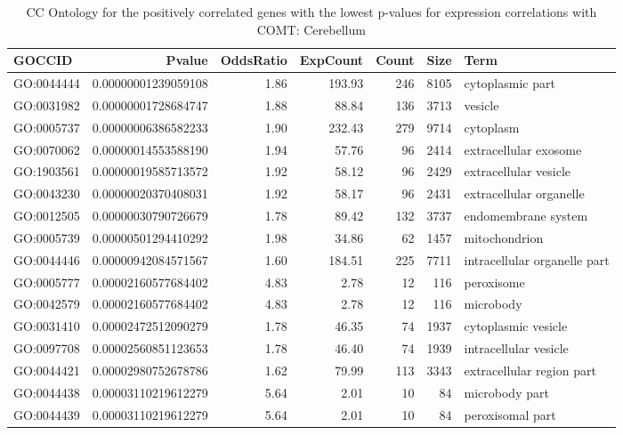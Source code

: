 \documentclass[letterpaper,12pt]{article}
\numberwithin{equation}{appendix}
\begin{document}
\noindent

\begin{landscape}

{\footnotesize {
\setlength\LTleft{-1cm}
\setlength\LTright{-1cm}
\begin{longtable}{lrrrrrl}
\caption{CC Ontology for the positively correlated genes with the lowest p-values for expression correlations with COMT: Cerebellum} \\ 
  \toprule
GOCCID & Pvalue & OddsRatio & ExpCount & Count & Size & Term \\ 
  \midrule
GO:0044444 & 0.00000001239059108 & 1.86 & 193.93 & 246 & 8105 & cytoplasmic part \\ 
  GO:0031982 & 0.00000001728684747 & 1.88 & 88.84 & 136 & 3713 & vesicle \\ 
  GO:0005737 & 0.00000006386582233 & 1.90 & 232.43 & 279 & 9714 & cytoplasm \\ 
  GO:0070062 & 0.00000014553588190 & 1.94 & 57.76 & 96 & 2414 & extracellular exosome \\ 
  GO:1903561 & 0.00000019585713572 & 1.92 & 58.12 & 96 & 2429 & extracellular vesicle \\ 
  GO:0043230 & 0.00000020370408031 & 1.92 & 58.17 & 96 & 2431 & extracellular organelle \\ 
  GO:0012505 & 0.00000030790726679 & 1.78 & 89.42 & 132 & 3737 & endomembrane system \\ 
  GO:0005739 & 0.00000501294410292 & 1.98 & 34.86 & 62 & 1457 & mitochondrion \\ 
  GO:0044446 & 0.00000942084571567 & 1.60 & 184.51 & 225 & 7711 & intracellular organelle part \\ 
  GO:0005777 & 0.00002160577684402 & 4.83 & 2.78 & 12 & 116 & peroxisome \\ 
  GO:0042579 & 0.00002160577684402 & 4.83 & 2.78 & 12 & 116 & microbody \\ 
  GO:0031410 & 0.00002472512090279 & 1.78 & 46.35 & 74 & 1937 & cytoplasmic vesicle \\ 
  GO:0097708 & 0.00002560851123653 & 1.78 & 46.40 & 74 & 1939 & intracellular vesicle \\ 
  GO:0044421 & 0.00002980752678786 & 1.62 & 79.99 & 113 & 3343 & extracellular region part \\ 
  GO:0044438 & 0.00003110219612279 & 5.64 & 2.01 & 10 & 84 & microbody part \\ 
  GO:0044439 & 0.00003110219612279 & 5.64 & 2.01 & 10 & 84 & peroxisomal part \\ 

\end{longtable}}}
\end{landscape}
\end{document}
